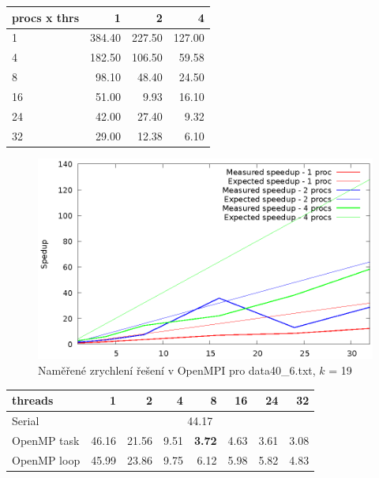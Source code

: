 \documentclass{article}
\begin{document}
\begin{center}
	\begin{tabular}{l|rrr}
	procs x thrs	& 1 & 2 & 4 \\
	\hline
	1 & 384.40 & 227.50 & 127.00 \\
	4 & 182.50 & 106.50 & 59.58 \\
	8 & 98.10 & 48.40 & 24.50 \\
	16 & 51.00 & 9.93 & 16.10 \\
	24 & 42.00 & 27.40 & 9.32 \\
	32 & 29.00 & 12.38 & 6.10 \\
	\end{tabular} 
	\label{table:parallel2}
	\begin{figure}[H]
		\centering
		\includegraphics{mpi_speedup_19_graph40_6.eps}
		\caption{Naměřené zrychlení řešení v OpenMPI pro data40\_6.txt, $k$ = 19}%
	\end{figure}
\end{center}

\begin{center}
\begin{tabular}{l|rrrrrrr}
	threads	& 1 & 2 & 4 & 8 & 16 & 24 & 32  \\ 
	\hline
	Serial 		& \multicolumn{7}{c}{44.17} \\ 
	OpenMP task & 46.16 & 21.56 & 9.51 & \textbf{3.72} & 4.63 & 3.61 & 3.08 \\ 
	OpenMP loop & 45.99 & 23.86 & 9.75 & 6.12 & 5.98 & 5.82 & 4.83 \\
\end{tabular} 
\label{table:parallel3}
\end{center}
\end{document}
